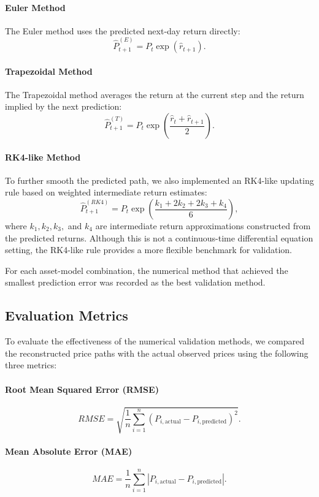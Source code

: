 \documentclass[12pt]{article}
\begin{document}
\paragraph{Euler Method}
The Euler method uses the predicted next-day return directly:
\[
\hat{P}_{t+1}^{(E)} = P_t \exp(\hat{r}_{t+1}).
\]

\paragraph{Trapezoidal Method}
The Trapezoidal method averages the return at the current step and the return implied by the next prediction:
\[
\hat{P}_{t+1}^{(T)} = P_t \exp\left(\frac{\hat{r}_t + \hat{r}_{t+1}}{2}\right).
\]

\paragraph{RK4-like Method}
To further smooth the predicted path, we also implemented an RK4-like updating rule based on weighted intermediate return estimates:
\[
\hat{P}_{t+1}^{(RK4)} = P_t \exp\left(\frac{k_1 + 2k_2 + 2k_3 + k_4}{6}\right),
\]
where $k_1, k_2, k_3,$ and $k_4$ are intermediate return approximations constructed from the predicted returns. Although this is not a continuous-time differential equation setting, the RK4-like rule provides a more flexible benchmark for validation.

For each asset-model combination, the numerical method that achieved the smallest prediction error was recorded as the best validation method.

\subsection{Evaluation Metrics}

To evaluate the effectiveness of the numerical validation methods, we compared the reconstructed price paths with the actual observed prices using the following three metrics:

\paragraph{Root Mean Squared Error (RMSE)}
\[
RMSE = \sqrt{\frac{1}{n}\sum_{i=1}^{n}(P_{i,\text{actual}} - P_{i,\text{predicted}})^2}.
\]

\paragraph{Mean Absolute Error (MAE)}
\[
MAE = \frac{1}{n}\sum_{i=1}^{n}\left|P_{i,\text{actual}} - P_{i,\text{predicted}}\right|.
\]
\end{document}
